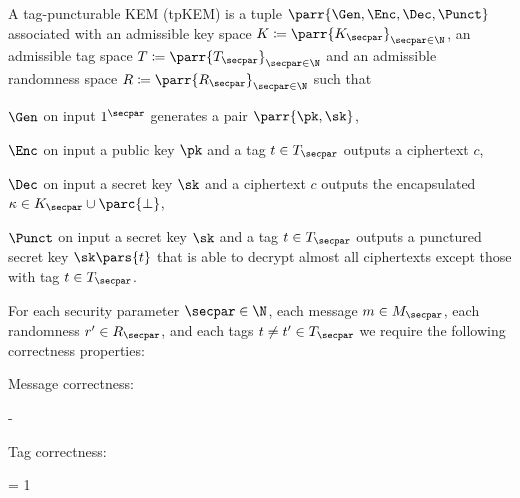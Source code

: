 \begin{definition}
    A tag-puncturable KEM (tpKEM) is a tuple \(\parr{\Gen,\Enc,\Dec,\Punct}\) associated with
    an admissible key space \(K \coloneqq \parr{K_\secpar}_{\secpar \in \N}\),
    an admissible tag space \(T \coloneqq \parr{T_\secpar}_{\secpar \in \N}\) and
    an admissible randomness space \(R \coloneqq \parr{R_\secpar}_{\secpar \in \N}\) such that
    \begin{sitemize}
        \item \(\Gen\) on input \(1^\secpar\) generates a pair \(\parr{\pk,\sk}\),
        \item \(\Enc\) on input a public key \(\pk\) and a tag \(t \in T_\secpar\) outputs a ciphertext \(c\),
        \item \(\Dec\) on input a secret key \(\sk\) and a ciphertext \(c\) outputs the encapsulated \(\kappa \in K_\secpar \cup \parc{\bot}\),
        \item \(\Punct\) on input a secret key \(\sk\) and a tag \(t \in T_\secpar\) outputs a punctured secret key \(\sk\pars{t}\) that is able to decrypt almost all ciphertexts except those with tag \(t \in T_\secpar\).
    \end{sitemize}
    For each security parameter \(\secpar \in \N\),
    each message \(m \in M_\secpar\),
    each randomness \(r' \in R_\secpar\),
    and each tags \(t \neq t' \in T_\secpar\) we require the following correctness properties:
    \begin{sitemize}
        \item Message correctness:
        \begin{bralign}
             - \negl\parr{\secpar}
        \end{bralign}

        \item Tag correctness:
        \begin{bralign}
            = 1
        \end{bralign}


\end{sitemize}
\end{definition}

